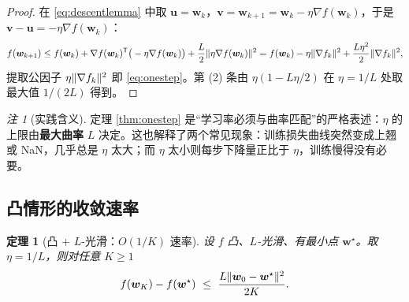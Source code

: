 \documentclass[UTF8,a4paper,11pt]{ctexart}
\theoremstyle{definition}
\theoremstyle{plain}
\newtheorem{theorem}[definition]{定理}
\theoremstyle{remark}
\newtheorem{remark}[definition]{注}
\DeclarePairedDelimiter{\norm}{\lVert}{\rVert}
\newcommand{\T}{^{\mathsf{T}}}
\begin{document}
\begin{proof}
在 \eqref{eq:descentlemma} 中取 $\bm{u}=\bm{w}_k$，$\bm{v}=\bm{w}_{k+1}=\bm{w}_k-\eta\nabla f(\bm{w}_k)$，于是 $\bm{v}-\bm{u}=-\eta\nabla f(\bm{w}_k)$：
\[
  f(\bm{w}_{k+1})\le f(\bm{w}_k)+\nabla f(\bm{w}_k)\T\big(-\eta\nabla f(\bm{w}_k)\big)+\frac{L}{2}\norm{\eta\nabla f(\bm{w}_k)}^2
  =f(\bm{w}_k)-\eta\norm{\nabla f_k}^2+\frac{L\eta^2}{2}\norm{\nabla f_k}^2 ,
\]
提取公因子 $\eta\norm{\nabla f_k}^2$ 即 \eqref{eq:onestep}。第 (2) 条由 $\eta(1-L\eta/2)$ 在 $\eta=1/L$ 处取最大值 $1/(2L)$ 得到。
\end{proof}

\begin{remark}[实践含义]
定理 \ref{thm:onestep} 是“学习率必须与曲率匹配”的严格表述：$\eta$ 的上限由\textbf{最大曲率} $L$ 决定。这也解释了两个常见现象：训练损失曲线突然变成上翘或 NaN，几乎总是 $\eta$ 太大；而 $\eta$ 太小则每步下降量正比于 $\eta$，训练慢得没有必要。
\end{remark}

\subsection{凸情形的收敛速率}

\begin{theorem}[凸 + $L$-光滑：$O(1/K)$ 速率]\label{thm:gd-convex}
设 $f$ 凸、$L$-光滑、有最小点 $\bm{w}^\star$。取 $\eta=1/L$，则对任意 $K\ge1$
\[
  f(\bm{w}_K)-f(\bm{w}^\star)\ \le\ \frac{L\norm{\bm{w}_0-\bm{w}^\star}^2}{2K} .
\]
\end{theorem}
\end{document}
